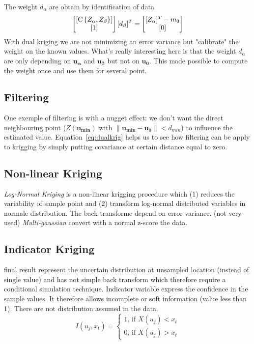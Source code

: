\documentclass[twocolumn]{article}
\numberwithin{equation}{section}
\begin{document}
The weight $d_\alpha$ are obtain by identification of data
\begin{equation}
		\begin{bmatrix}
       		[\operatorname{C}\left\{Z_\alpha,Z_\beta\right\}]		\\
       		[1]													\\
     	\end{bmatrix} 
       	[d_\beta]^T 	\\
     	=
     	\begin{bmatrix}
       		[Z_\alpha]^T - m_0 	\\
       		[0] 					\\
     	\end{bmatrix}
\end{equation}
With dual kriging we are not minimizing an error variance but "calibrate" the weight on the known values. What's really interesting here is that the weight $d_\alpha$ are only depending on $\boldsymbol{u_\alpha}$ and $\boldsymbol{u_\beta}$ but not on $\boldsymbol{u_0}$. This made possible to compute the weight once and use them for several point.

\subsection{Filtering}
One exemple of filtering is with a nugget effect: we don't want the direct neighbouring point ($Z(\boldsymbol{u_{min}})$ with $\| \boldsymbol{u_{min}}-\boldsymbol{u_0}\|< d_{min}$) to influence the estimated value. Equation~\ref{eq:dualkrig} helps us to see how filtering can be apply to krigging by simply putting covariance at certain distance equal to zero. 


\subsection{Non-linear Kriging}
 \emph{Log-Normal Kriging} is a non-linear krigging procedure which (1) reduces the variability of sample point and (2) transform log-normal distributed variables in normale distribution. The back-transforme depend on error variance. (not very used)
\emph{Multi-gaussian} convert with a normal z-score the data. 

\subsection{Indicator Kriging} final result represent the uncertain distribution at unsampled location (instead of single value) and has not simple back transform which therefore require a conditional simulation technique. Indicator variable express the confidence in the sample values. It therefore allows incomplete or soft information (value less than 1). There are not distribution assumed in the data.
\[I(u_j,x_t) = \left\{
	\begin{array}{l}
		1 \text{, if }X(u_j)<x_t\\
		0 \text{, if }X(u_j)>x_t
	\end{array}
\right.\]	
\end{document}

